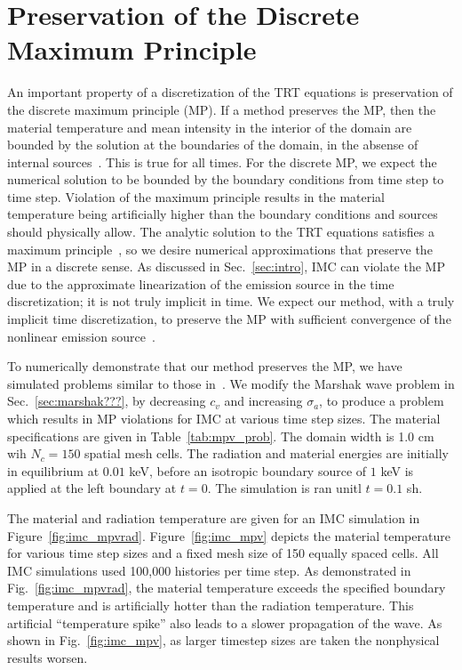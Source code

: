 
\section{Preservation of the Discrete Maximum Principle}

An important property of a discretization of the TRT equations is preservation of the
discrete maximum principle (MP).  If a method preserves the MP, then the
material temperature and mean intensity in the interior of the domain are bounded by the solution at the boundaries of
the domain, in the absense of internal sources~\cite{wollaber2013discrete,larsen_mpv}.
This is true for all times.
For the discrete MP, we expect the numerical solution to be bounded by the boundary
conditions from time step to time step.  Violation of the maximum principle results in the
material temperature being artificially higher than the boundary conditions and sources
should physically allow.  The analytic solution to the TRT equations satisfies a maximum
principle~\cite{larsen_mpv}, so we desire numerical approximations that preserve the MP in
a discrete sense.  As discussed in Sec.~\ref{sec:intro}, IMC can violate the MP due to the
approximate linearization of the emission source in the time discretization; it is not
truly implicit in time.  We expect our method, with a truly implicit time discretization,
to preserve the MP with sufficient convergence of the nonlinear emission
source~\cite{larsen_mpv}.

To numerically demonstrate that our method preserves the MP, we have simulated problems
similar to those in~\cite{wollaber2013discrete}.  We modify the Marshak wave problem in
Sec.~\ref{sec:marshak???}, by decreasing $c_v$ and increasing $\sigma_a$, to produce a
problem which results in MP violations for IMC at various time step sizes.  The material
specifications are given in Table~\ref{tab:mpv_prob}. The domain width is 1.0 cm wih
$N_c=150$ spatial mesh cells.  The radiation and material energies are initially in
equilibrium at $0.01$ keV, before an isotropic boundary source of $1$ keV is applied at
the left boundary at $t=0$. The simulation is ran unitl $t=0.1$ sh. 

The material and radiation temperature are given for an IMC simulation in
Figure~\ref{fig:imc_mpvrad}.  Figure~\ref{fig:imc_mpv} depicts the material temperature
for various time step sizes and a fixed mesh size of 150 equally spaced cells. All IMC
simulations used 100,000 histories per time step. As demonstrated in
Fig.~\ref{fig:imc_mpvrad}, the material temperature exceeds the specified boundary
temperature and is artificially hotter than the radiation temperature.  This artificial
``temperature spike'' also leads to a slower propagation of the wave.  As shown in
Fig.~\ref{fig:imc_mpv}, as larger timestep sizes are taken the nonphysical results worsen.

